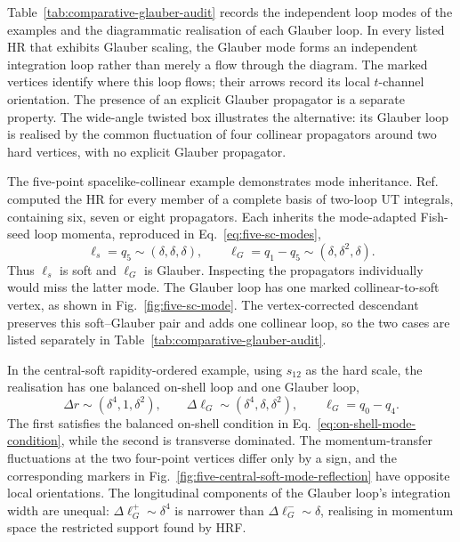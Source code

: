 \documentclass[a4paper,11pt]{article}
\begin{document}
Table~\ref{tab:comparative-glauber-audit} records the independent loop modes of
the examples and the diagrammatic realisation of each Glauber loop.  In every
listed HR that exhibits Glauber scaling, the
Glauber mode forms an independent integration loop rather than merely a flow
through the diagram.  The marked vertices identify where this loop flows;
their arrows record its local \(t\)-channel orientation.  The presence of an
explicit Glauber propagator is a separate property.  The wide-angle twisted
box illustrates the alternative: its Glauber loop is realised by the common
fluctuation of four collinear propagators around two hard vertices, with no
explicit Glauber propagator.

The five-point spacelike-collinear example demonstrates mode inheritance.
Ref.~\cite{Chen:2026dnj} computed the HR for every member of a complete basis
of two-loop UT integrals, containing six, seven or eight propagators.  Each
inherits the mode-adapted Fish-seed loop momenta, reproduced in
Eq.~\eqref{eq:five-sc-modes},
\begin{equation}
 \ell_s=q_5\sim(\delta,\delta,\delta),
 \qquad
 \ell_G=q_1-q_5\sim(\delta,\delta^2,\delta).
 \label{eq:five-sc-glauber-rerouting-summary}
\end{equation}
Thus \(\ell_s\) is soft and \(\ell_G\) is Glauber.  Inspecting the propagators
individually would miss the latter mode.
The Glauber loop has one marked collinear-to-soft vertex, as shown in
Fig.~\ref{fig:five-sc-mode}.  The vertex-corrected descendant preserves this
soft--Glauber pair and adds one collinear loop, so the two cases are listed
separately in Table~\ref{tab:comparative-glauber-audit}.

In the central-soft rapidity-ordered example, using \(s_{12}\) as the hard
scale, the realisation has one balanced on-shell loop and one Glauber loop,
\begin{equation}
 \Delta r\sim(\delta^4,1,\delta^2),
 \qquad
 \Delta\ell_G\sim(\delta^4,\delta,\delta^2),
 \qquad \ell_G=q_0-q_4.
 \label{eq:five-central-soft-mode-summary}
\end{equation}
The first satisfies the balanced on-shell condition in
Eq.~\eqref{eq:on-shell-mode-condition}, while the second is transverse dominated.
The momentum-transfer fluctuations at the two four-point vertices differ only
by a sign, and the corresponding markers in
Fig.~\ref{fig:five-central-soft-mode-reflection} have opposite local
orientations.  The longitudinal components of the Glauber loop's
integration width are unequal: \(\Delta\ell_G^+\sim\delta^4\) is narrower than
\(\Delta\ell_G^-\sim\delta\), realising in momentum space the restricted
support found by HRF.
\end{document}
